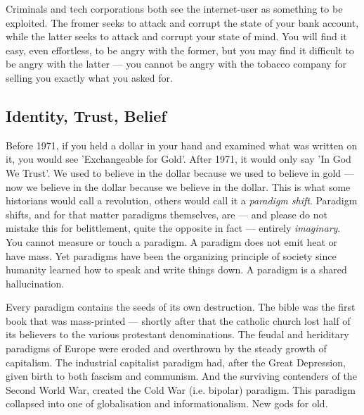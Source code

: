 \documentclass[a4paper]{article}
\begin{document}
Criminals and tech corporations both see the internet-user as something to be exploited. The fromer seeks to attack and corrupt the state of your bank account, while the latter seeks to attack and corrupt your state of mind. You will find it easy, even effortless, to be angry with the former, but you may find it difficult to be angry with the latter ---  you cannot be angry with the tobacco company for selling you exactly what you asked for.
\subsection{Identity, Trust, Belief}
\label{Identity, Trust, Belief}

Before 1971, if you held a dollar in your hand and examined what was written on it, you would see 'Exchangeable for Gold'. After 1971, it would only say 'In God We Trust'. We used to believe in the dollar because we used to believe in gold ---  now we believe in the dollar because we believe in the dollar. This is what some historians would call a revolution, others would call it a \emph{paradigm shift}. Paradigm shifts, and for that matter paradigms themselves, are ---  and please do not mistake this for belittlement, quite the opposite in fact ---  entirely \emph{imaginary}. You cannot measure or touch a paradigm. A paradigm does not emit heat or have mass. Yet paradigms have been the organizing principle of society since humanity learned how to speak and write things down. A paradigm is a shared hallucination.

Every paradigm contains the seeds of its own destruction. The bible was the first book that was mass-printed ---  shortly after that the catholic church lost half of its believers to the various protestant denominations. The feudal and heriditary paradigms of Europe were eroded and overthrown by the steady growth of capitalism. The industrial capitalist paradigm had, after the Great Depression, given birth to both fascism and communism. And the surviving contenders of the Second World War, created the Cold War (i.e. bipolar) paradigm. This paradigm collapsed into one of globalisation and informationalism. New gods for old.
\end{document}
